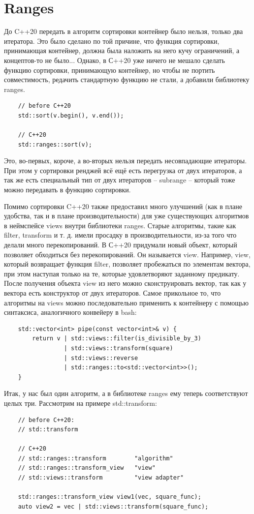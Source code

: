 \documentclass[12pt, a4paper]{article}
\begin{document}
\section{Ranges}
До C++20 передать в алгоритм сортировки контейнер было нельзя, только два итератора. Это было сделано по той причине, что функция сортировки, принимающая контейнер, должна была наложить на него кучу ограничений, а концептов-то не было... Однако, в С++20 уже ничего не мешало сделать функцию сортировки, принимающую контейнер, но чтобы не портить совместимость, редачить стандартную функцию не стали, а добавили библиотеку ranges.
\begin{verbatim}
	// before C++20
	std::sort(v.begin(), v.end());
	
	// C++20
	std::ranges::sort(v);
\end{verbatim}
Это, во-первых, короче, а во-вторых нельзя передать несовпадающие итераторы. При этом у сортировки ренджей всё ещё есть перегрузка от двух итераторов, а так же есть специальный тип от двух итераторов -- subrange -- который тоже можно передавать в функцию сортировки.\\
\par Помимо сортировки C++20 также предоставил много улучшений (как в плане удобства, так и в плане производительности) для уже существующих алгоритмов в неймспейсе views внутри библиотеки ranges. Старые алгоритмы, такие как filter, transform и т. д. имели просадку в производительности, из-за того что делали много перекопирований. В С++20 придумали новый объект, который позволяет обходиться без перекопирований. Он называется view. Например, view, который возвращает функция filter, позволяет пробежаться по элементам вектора, при этом наступая только на те, которые удовлетворяют заданному предикату. После получения объекта view из него можно сконструировать вектор, так как у вектора есть конструктор от двух итераторов. Самое прикольное то, что алгоритмы на views можно последовательно применить к контейнеру с помощью синтаксиса, аналогичного конвейеру в bash:
\begin{verbatim}
	std::vector<int> pipe(const vector<int>& v) {
		return v | std::views::filter(is_divisible_by_3)
				 | std::views::transform(square)
				 | std::views::reverse
				 | std::ranges::to<std::vector<int>>();
	}
\end{verbatim}
Итак, у нас был один алгоритм, а в библиотеке ranges ему теперь соответствуют целых три. Рассмотрим на примере std::transform:
\begin{verbatim}
	// before C++20:
	// std::transform
	
	// C++20
	// std::ranges::transform        "algorithm"
	// std::ranges::transform_view   "view"
	// std::views::transform         "view adapter"
	
	std::ranges::transform_view view1(vec, square_func);
	auto view2 = vec | std::views::transform(square_func);
\end{verbatim}
\end{document}
